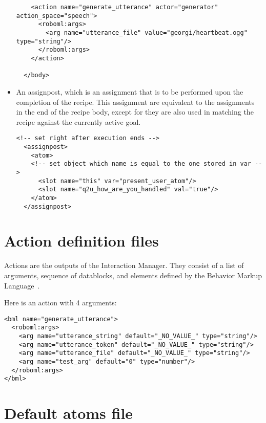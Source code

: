 \begin{itemize}
\begin{lstlisting}
    <action name="generate_utterance" actor="generator" action_space="speech">
      <roboml:args>
        <arg name="utterance_file" value="georgi/heartbeat.ogg" type="string"/>
      </roboml:args>
    </action>
    
  </body>
\end{lstlisting}

\item An assignpost, which is an assignment that is to be performed upon the completion of the recipe. This assignment are equivalent to the assignments in the end of the recipe body, except for they are also used in matching the recipe against the currently active goal. 

\lstset{language=XML}
\begin{lstlisting}
<!-- set right after execution ends -->
  <assignpost>
    <atom>
    <!-- set object which name is equal to the one stored in var -->
      <slot name="this" var="present_user_atom"/>
      <slot name="q2u_how_are_you_handled" val="true"/>
    </atom>
  </assignpost>
\end{lstlisting}


\end{itemize}

\section{Action definition files}

Actions are the outputs of the Interaction Manager. They consist of a list of arguments, sequence of datablocks, and elements defined by the Behavior Markup Language~\citep{BMLweb}.


Here is an action with 4 arguments:

\lstset{language=XML}
\begin{lstlisting}
<bml name="generate_utterance">
  <roboml:args>
    <arg name="utterance_string" default="_NO_VALUE_" type="string"/>
    <arg name="utterance_token" default="_NO_VALUE_" type="string"/>
    <arg name="utterance_file" default="_NO_VALUE_" type="string"/>
    <arg name="test_arg" default="0" type="number"/>
  </roboml:args>
</bml>
\end{lstlisting}

\section{Default atoms file}
